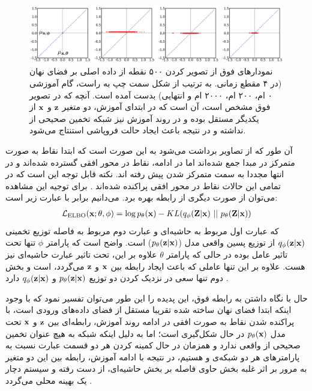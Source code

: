 \begin{figure}[H]
	\centering
	\includegraphics[width=1.\textwidth]{images/lagging2.png}
	\caption{
		نمودارهای فوق از تصویر کردن ۵۰۰ نقطه از داده اصلی بر فضای نهان (در ۴ مقطع زمانی. به ترتیب از شکل سمت چپ به راست، گام آموزشی ۰ ام، ۲۰۰ ام، ۲۰۰۰ ام و انتهایی) بدست آمده است. آنچه که در تصویر فوق مشخص است، آن است که در ابتدای آموزش، دو متغیر ${\bf z}$ و ${\bf x}$ از یکدیگر مستقل بوده و در روند آموزش نیز شبکه \encoder{} تخمین صحیحی از \posteriordist{} نداشته و در نتیجه باعث ایجاد حالت فروپاشی استنتاج می‌شود.
	}
\end{figure}
آن طور که از تصاویر برداشت می‌شود به این صورت است که ابتدا نقاط به صورت متمرکز در مبدا جمع شده‌اند اما در ادامه، نقاط در محور افقی گسترده شده‌اند و در انتها مجددا به سمت متمرکز شدن پیش رفته اند. نکته قابل توجه این است که در تمامی این حالات نقاط در محور افقی پراکنده شده‌اند \cite{infovae}. برای توجیه این مشاهده می‌توان از صورت دیگری از رابطه  بهره برد. می‌دانیم  برابر با عبارت زیر است:
\begin{gather}
	\mathcal{L}_{\text{ELBO}}({\bf x};\theta, \phi) = \log p_\theta({\bf x}) - {KL}(q_\phi({\bf Z}|{\bf x})~||~ p_\theta({\bf Z}|{\bf x}))
\end{gather}
که عبارت اول مربوط به \likelihood{} حاشیه‌ای و عبارت دوم مربوط به فاصله توزیع تخمینی $q_\phi({\bf z}|{\bf x})$ از توزیع پسین واقعی مدل ($p_\theta({\bf z}|{\bf x})$) است. واضح است که پارامتر $\phi$ تنها تحت تاثیر عامل  بوده در حالی که پارامتر $\theta$ علاوه بر این، تحت تاثیر عبارت \likelihood{} حاشیه‌ای نیز هست. علاوه بر این تنها عاملی که باعث ایجاد رابطه بین ${\bf x}$ و ${\bf z}$ می‌گردد،
\likelihood{}
است و بخش دوم تنها سعی در نزدیک کردن دو توزیع $p_\theta({\bf z}|{\bf x})$ و $q_\phi({\bf z}|{\bf x})$ دارد \cite{infovae}.

حال با نگاه داشتن به رابطه فوق، این پدیده را این طور می‌توان تفسیر نمود که با وجود اینکه ابتدا فضای نهان ساخته شده تقریبا مستقل از فضای داده‌های ورودی است، با پراکنده شدن نقاط به صورت افقی در ادامه روند آموزش، رابطه‌ای بین ${\bf z}$ و ${\bf x}$ تحت مدل $p_\theta({\bf x})$ در حال شکل‌گیری است؛ اما به دلیل اینکه شبکه \encoder{} به هیچ عنوان تخمین صحیحی از \posteriordist{} واقعی ندارد و همزمان در حال کمینه کردن هر دو قسمت عبارت  نسبت به پارامترهای هر دو شبکه‌ی \encoder{} و \decoder{} هستیم، در نتیجه با ادامه آموزش، رابطه بین این دو متغیر به مرور بر اثر غلبه بخش حاوی فاصله  بر بخش \likelihood{} حاشیه‌ای، از دست رفته و سیستم دچار یک بهینه محلی می‌گردد \cite{infovae}.

